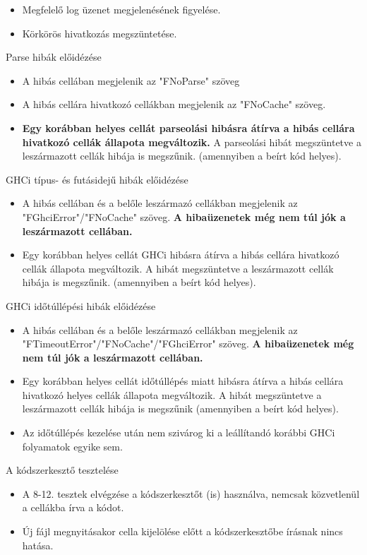 \begin{compactenum}
\begin{itemize}
		\item Megfelelő log üzenet megjelenésének figyelése.		
		\item Körkörös hivatkozás megszüntetése.
	\end{itemize}
	\item Parse hibák előidézése
	\begin{itemize}
		\item A hibás cellában megjelenik az "FNoParse" szöveg
		\item A hibás cellára hivatkozó cellákban megjelenik az "FNoCache" szöveg.
		\item \textbf{Egy korábban helyes cellát parseolási hibásra átírva a hibás cellára hivatkozó cellák állapota megváltozik.} A parseolási hibát megszüntetve a leszármazott cellák hibája is megszűnik. (amennyiben a beírt kód helyes).
	\end{itemize}
	\item GHCi típus- és futásidejű hibák előidézése
	\begin{itemize}
		\item A hibás cellában és a belőle leszármazó cellákban megjelenik az "FGhciError"/"FNoCache" szöveg. \textbf{A hibaüzenetek még nem túl jók a leszármazott cellában.}
		\item Egy korábban helyes cellát GHCi hibásra átírva a hibás cellára hivatkozó cellák állapota megváltozik. A hibát megszüntetve a leszármazott cellák hibája is megszűnik. (amennyiben a beírt kód helyes).
	\end{itemize}
	\item GHCi időtúllépési hibák előidézése
	\begin{itemize}
		\item A hibás cellában és a belőle leszármazó cellákban megjelenik az "FTimeoutError"/"FNoCache"/"FGhciError" szöveg. \textbf{A hibaüzenetek még nem túl jók a leszármazott cellában.}
		\item Egy korábban helyes cellát időtúllépés miatt hibásra átírva a hibás cellára hivatkozó helyes cellák állapota megváltozik. A hibát megszüntetve a leszármazott cellák hibája is megszűnik (amennyiben a beírt kód helyes).
		\item Az időtúllépés kezelése után nem szivárog ki a leállítandó korábbi GHCi folyamatok egyike sem.
	\end{itemize}
	\item A kódszerkesztő tesztelése 
	\begin{itemize}
		\item A 8-12. tesztek elvégzése a kódszerkesztőt (is) használva, nemcsak közvetlenül a cellákba írva a kódot.
		\item Új fájl megnyitásakor cella kijelölése előtt a kódszerkesztőbe írásnak nincs hatása.	
	\end{itemize}		
\end{compactenum}

